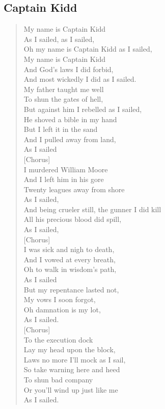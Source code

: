 \documentclass[11pt]{article}
\begin{document}
\subsection{Captain Kidd}
\label{sec:org147c8c9}
\begin{verse}
My name is Captain Kidd\\
As I sailed, as I sailed,\\
Oh my name is Captain Kidd as I sailed,\\
My name is Captain Kidd\\
And God's laws I did forbid,\\
And most wickedly I did as I sailed.\\
\vspace*{1em}
My father taught me well\\
To shun the gates of hell,\\
But against him I rebelled as I sailed,\\
He shoved a bible in my hand\\
But I left it in the sand\\
And I pulled away from land,\\
As I sailed\\
\vspace*{1em}
[Chorus]\\
\vspace*{1em}
I murdered William Moore\\
And I left him in his gore\\
Twenty leagues away from shore\\
As I sailed,\\
And being crueler still, the gunner I did kill\\
All his precious blood did spill,\\
As I sailed,\\
\vspace*{1em}
[Chorus]\\
\vspace*{1em}
I was sick and nigh to death,\\
And I vowed at every breath,\\
Oh to walk in wisdom's path,\\
As I sailed\\
But my repentance lasted not,\\
My vows I soon forgot,\\
Oh damnation is my lot,\\
As I sailed.\\
\vspace*{1em}
[Chorus]\\
\vspace*{1em}
To the execution dock\\
Lay my head upon the block,\\
Laws no more I'll mock as I sail,\\
So take warning here and heed\\
To shun bad company\\
Or you'll wind up just like me\\
As I sailed.\\
\end{verse}
\clearpage
\end{document}
